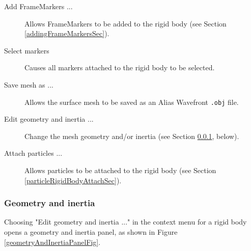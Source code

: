 \documentclass{article}
\begin{document}
\begin{description}

\item[Add FrameMarkers ...]\mbox{}

Allows FrameMarkers to be added to the rigid body 
(see Section \ref{addingFrameMarkersSec}).

\item[Select markers]\mbox{}

Causes all markers attached to the rigid body to be selected.

\item[Save mesh as ...]\mbox{}

Allows the surface mesh to be saved as an Alias Wavefront {\tt .obj} file.

\item[Edit geometry and inertia ...]\mbox{}

Change the mesh geometry and/or inertia 
(see Section \ref{geometryAndInertiaSec}, below).

\item[Attach particles ...]\mbox{}

Allows particles to be attached to the rigid body 
(see Section \ref{particleRigidBodyAttachSec}).

\end{description}

\subsubsection{Geometry and inertia}
\label{geometryAndInertiaSec}

Choosing {\sf "Edit geometry and inertia ..."} in the context menu for
a rigid body opens a geometry and inertia panel, as shown in
Figure \ref{geometryAndInertiaPanelFig}.
\end{document}

